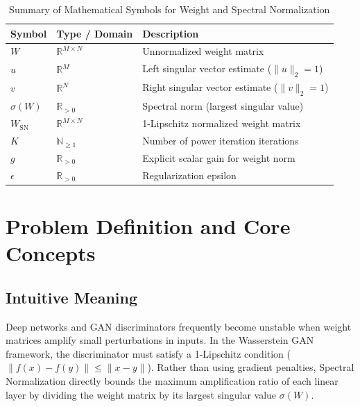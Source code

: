 \documentclass[11pt,a4paper]{article}
\theoremstyle{definition}
\begin{document}
\begin{table}[h]
\centering
\caption{Summary of Mathematical Symbols for Weight and Spectral Normalization}
\begin{tabular}{lll}
\toprule
\textbf{Symbol} & \textbf{Type / Domain} & \textbf{Description} \\
\midrule
$W$ & $\mathbb{R}^{M \times N}$ & Unnormalized weight matrix \\
$u$ & $\mathbb{R}^M$ & Left singular vector estimate ($\|u\|_2 = 1$) \\
$v$ & $\mathbb{R}^N$ & Right singular vector estimate ($\|v\|_2 = 1$) \\
$\sigma(W)$ & $\mathbb{R}_{> 0}$ & Spectral norm (largest singular value) \\
$W_{\text{SN}}$ & $\mathbb{R}^{M \times N}$ & 1-Lipschitz normalized weight matrix \\
$K$ & $\mathbb{N}_{\ge 1}$ & Number of power iteration iterations \\
$g$ & $\mathbb{R}_{> 0}$ & Explicit scalar gain for weight norm \\
$\epsilon$ & $\mathbb{R}_{> 0}$ & Regularization epsilon \\
\bottomrule
\end{tabular}
\end{table}

\section{Problem Definition and Core Concepts}

\subsection{Intuitive Meaning}
Deep networks and GAN discriminators frequently become unstable when weight matrices amplify small perturbations in inputs. In the Wasserstein GAN framework, the discriminator must satisfy a 1-Lipschitz condition ($\|f(x) - f(y)\| \le \|x - y\|$). Rather than using gradient penalties, Spectral Normalization directly bounds the maximum amplification ratio of each linear layer by dividing the weight matrix by its largest singular value $\sigma(W)$.
\end{document}

